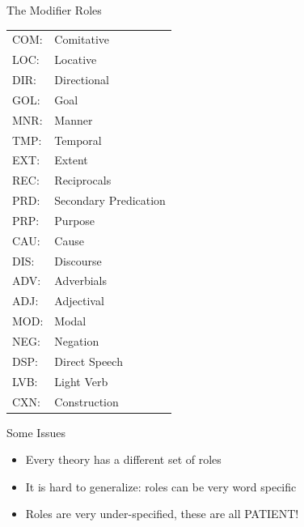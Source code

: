 \begin{frame}{The Modifier Roles}
\begin{small}
\begin{tabular}{ll}
COM: & Comitative \\
LOC: & Locative \\
DIR: & Directional \\
GOL: & Goal \\
MNR: & Manner \\
TMP: & Temporal \\
EXT: & Extent \\
REC: & Reciprocals \\
PRD: & Secondary Predication \\
PRP: & Purpose \\
CAU: & Cause \\
DIS: & Discourse \\
ADV: & Adverbials \\
ADJ: & Adjectival \\
MOD: & Modal \\
NEG: & Negation \\
DSP: & Direct Speech \\
LVB: & Light Verb \\
CXN: & Construction 
\end{tabular}
  \end{small}

\end{frame}

\begin{frame}{Some Issues}
\begin{itemize}
\item  Every theory has a different set of roles
\item  It is hard to generalize: roles can be very word specific
\item  Roles are very under-specified, these are all PATIENT!
\begin{exe}
\ex{}
\ex{}
\ex{}
\ex{}
\end{exe}
\end{itemize}



\end{frame}

